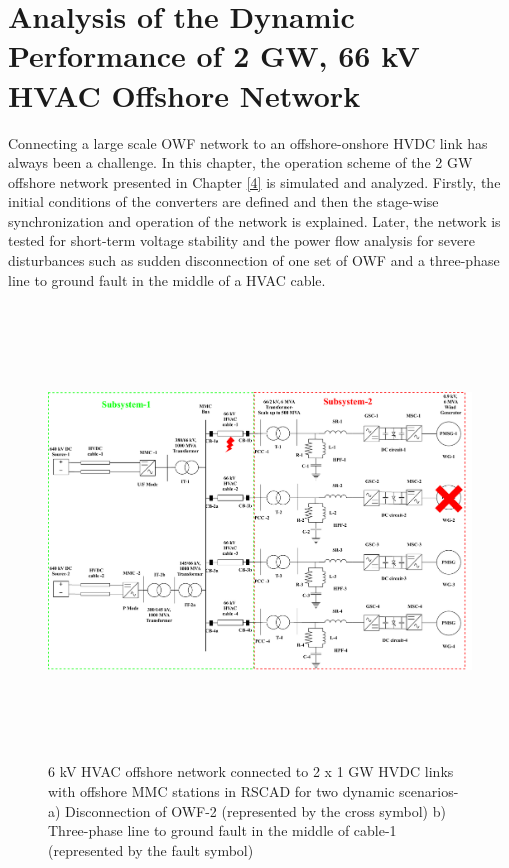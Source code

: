 \chapter{Analysis of the Dynamic Performance of 2 GW, 66 kV HVAC Offshore Network}\label{5}

Connecting a large scale \gls{OWF} network to an offshore-onshore \gls{HVDC} link has always been a challenge. In this chapter, the operation scheme of the 2 GW offshore network presented in Chapter \ref{4} is simulated and analyzed. Firstly, the initial conditions of the converters are defined and then the stage-wise synchronization and operation of the network is explained. Later, the network is tested for short-term voltage stability and the power flow analysis for severe disturbances such as sudden disconnection of one set of \gls{OWF} and a three-phase line to ground fault in the middle of a \gls{HVAC} cable.

\begin{figure}[H]
\centering
    \includegraphics[height = 12cm,width = \textwidth]{Diagrams/Chapter_5/WT4_MMC2_fault.pdf}
    \caption{6 kV HVAC offshore network connected to 2 x 1 GW HVDC links with offshore MMC stations in RSCAD for two dynamic scenarios- \newline 
    a) Disconnection of OWF-2 (represented by the cross symbol) \newline 
    b) Three-phase line to ground fault in the middle of cable-1 (represented by the fault symbol)}
    \label{fig:WT4_MMC2_Chap5}
\end{figure}

